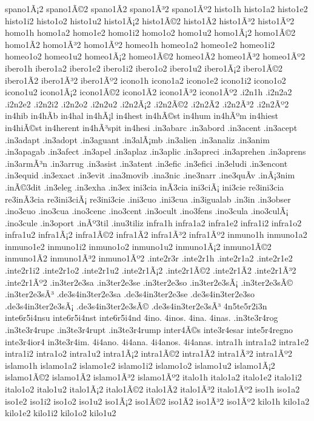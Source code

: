 {spano1Ã¡2 spano1Ã©2 spano1Ã­2 spano1Ã³2 spano1Ãº2
histo1h
histo1a2 histo1e2 histo1i2 histo1o2 histo1u2
histo1Ã¡2 histo1Ã©2 histo1Ã­2 histo1Ã³2 histo1Ãº2
homo1h
homo1a2 homo1e2 homo1i2 homo1o2 homo1u2
homo1Ã¡2 homo1Ã©2 homo1Ã­2 homo1Ã³2 homo1Ãº2
homeo1h
homeo1a2 homeo1e2 homeo1i2 homeo1o2 homeo1u2
homeo1Ã¡2 homeo1Ã©2 homeo1Ã­2 homeo1Ã³2 homeo1Ãº2
ibero1h
ibero1a2 ibero1e2 ibero1i2 ibero1o2 ibero1u2
ibero1Ã¡2 ibero1Ã©2 ibero1Ã­2 ibero1Ã³2 ibero1Ãº2
icono1h
icono1a2 icono1e2 icono1i2 icono1o2 icono1u2
icono1Ã¡2 icono1Ã©2 icono1Ã­2 icono1Ã³2 icono1Ãº2
.i2n1h
.i2n2a2 .i2n2e2 .i2n2i2 .i2n2o2 .i2n2u2
.i2n2Ã¡2 .i2n2Ã©2 .i2n2Ã­2 .i2n2Ã³2 .i2n2Ãº2
in4hib
in4hÃ­b
in4hal
in4hÃ¡l
in4hest
in4hÃ©st
in4hum
in4hÃºm
in4hiest
in4hiÃ©st
in4herent
in4hÃ³spit
in4hesi
.in3abarc
.in3abord
.in3acent
.in3acept
.in3adapt
.in3adopt
.in3aguant
.in3alÃ¡mb
.in3alien
.in3analiz
.in3anim
.in3apagab
.in3afect
.in3apel
.in3aplaz
.in3aplic
.in3apreci
.in3aprehen
.in3aprens
.in3armÃ³n
.in3arrug
.in3asist
.in3atent
.in3efic
.in3efici
.in3eludi
.in3encont
.in3equid
.in3exact
.in3evit
.ina3movib
.ina3nic
.ine3narr
.ine3quÃ­v
.inÃ¡3nim
.inÃ©3dit
.in3eleg
.in3exha
.in3ex
ini3cia
inÃ­3cia
ini3ciÃ¡
ini3cie
re3ini3cia
re3inÃ­3cia
re3ini3ciÃ¡
re3ini3cie
.ini3cuo
.ini3cua
.in3igualab
.in3in
.in3obser
.ino3cuo
.ino3cua
.ino3cenc
.ino3cent
.in3ocult
.ino3fens
.ino3cula
.ino3culÃ¡
.ino3cule
.in3oport
.inÃº3til
.inu3tiliz
infra1h
infra1a2 infra1e2 infra1i2 infra1o2 infra1u2
infra1Ã¡2 infra1Ã©2 infra1Ã­2 infra1Ã³2 infra1Ãº2
inmuno1h
inmuno1a2 inmuno1e2 inmuno1i2 inmuno1o2 inmuno1u2
inmuno1Ã¡2 inmuno1Ã©2 inmuno1Ã­2 inmuno1Ã³2 inmuno1Ãº2
.inte2r3r
.inte2r1h
.inte2r1a2 .inte2r1e2 .inte2r1i2 .inte2r1o2 .inte2r1u2
.inte2r1Ã¡2 .inte2r1Ã©2 .inte2r1Ã­2 .inte2r1Ã³2 .inte2r1Ãº2
.in3ter2e3sa
.in3ter2e3se
.in3ter2e3so
.in3ter2e3sÃ¡
.in3ter2e3sÃ©
.in3ter2e3sÃ³
.de3s4in3ter2e3sa
.de3s4in3ter2e3se
.de3s4in3ter2e3so
.de3s4in3ter2e3sÃ¡
.de3s4in3ter2e3sÃ©
.de3s4in3ter2e3sÃ³
4n5te5r2i3n
inte6r5i4nsu
inte6r5i4nst
inte6r5i4nd
4ino.
4inos.
4ina.
4inas.
.in3te3r4rog
.in3te3r4rupc
.in3te3r4rupt
.in3te3r4rump
inter4Ã©s
inte3r4esar
inte5r4regno
inte3r4ior4
in3te3r4im.
4i4ano.
4i4ana.
4i4anos.
4i4anas.
intra1h
intra1a2 intra1e2 intra1i2 intra1o2 intra1u2
intra1Ã¡2 intra1Ã©2 intra1Ã­2 intra1Ã³2 intra1Ãº2
islamo1h
islamo1a2 islamo1e2 islamo1i2 islamo1o2 islamo1u2
islamo1Ã¡2 islamo1Ã©2 islamo1Ã­2 islamo1Ã³2 islamo1Ãº2
italo1h
italo1a2 italo1e2 italo1i2 italo1o2 italo1u2
italo1Ã¡2 italo1Ã©2 italo1Ã­2 italo1Ã³2 italo1Ãº2
iso1h
iso1a2 iso1e2 iso1i2 iso1o2 iso1u2
iso1Ã¡2 iso1Ã©2 iso1Ã­2 iso1Ã³2 iso1Ãº2
kilo1h
kilo1a2 kilo1e2 kilo1i2 kilo1o2 kilo1u2
}
